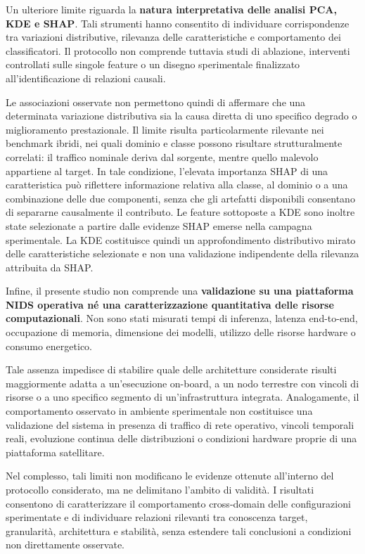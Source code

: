 Un ulteriore limite riguarda la \textbf{natura interpretativa delle analisi PCA, KDE e SHAP}.
Tali strumenti hanno consentito di individuare corrispondenze tra variazioni distributive, rilevanza delle caratteristiche e comportamento dei classificatori.
Il protocollo non comprende tuttavia studi di ablazione, interventi controllati sulle singole feature o un disegno sperimentale finalizzato all'identificazione di relazioni causali.

Le associazioni osservate non permettono quindi di affermare che una determinata variazione distributiva sia la causa diretta di uno specifico degrado o miglioramento prestazionale.
Il limite risulta particolarmente rilevante nei benchmark ibridi, nei quali dominio e classe possono risultare strutturalmente correlati: il traffico nominale deriva dal sorgente, mentre quello malevolo appartiene al target.
In tale condizione, l'elevata importanza SHAP di una caratteristica può riflettere informazione relativa alla classe, al dominio o a una combinazione delle due componenti, senza che gli artefatti disponibili consentano di separarne causalmente il contributo.
Le feature sottoposte a KDE sono inoltre state selezionate a partire dalle evidenze SHAP emerse nella campagna sperimentale. La KDE costituisce quindi un approfondimento distributivo mirato delle caratteristiche selezionate e non una validazione indipendente della rilevanza attribuita da SHAP.

Infine, il presente studio non comprende una \textbf{validazione su una piattaforma NIDS operativa né una caratterizzazione quantitativa delle risorse computazionali}.
Non sono stati misurati tempi di inferenza, latenza end-to-end, occupazione di memoria, dimensione dei modelli, utilizzo delle risorse hardware o consumo energetico.

Tale assenza impedisce di stabilire quale delle architetture considerate risulti maggiormente adatta a un'esecuzione on-board, a un nodo terrestre con vincoli di risorse o a uno specifico segmento di un'infrastruttura integrata.
Analogamente, il comportamento osservato in ambiente sperimentale non costituisce una validazione del sistema in presenza di traffico di rete operativo, vincoli temporali reali, evoluzione continua delle distribuzioni o condizioni hardware proprie di una piattaforma satellitare.

Nel complesso, tali limiti non modificano le evidenze ottenute all'interno del protocollo considerato, ma ne delimitano l'ambito di validità.
I risultati consentono di caratterizzare il comportamento cross-domain delle configurazioni sperimentate e di individuare relazioni rilevanti tra conoscenza target, granularità, architettura e stabilità, senza estendere tali conclusioni a condizioni non direttamente osservate.

